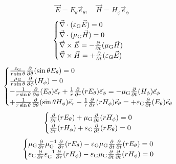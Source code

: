 \begin{equation}
    \vec{E}={E}_\theta\vec{e}_\theta,\quad\vec{H}={H}_\phi\vec{e}_\phi
\end{equation}
\begin{equation}
    \begin{cases}
        \vec{\nabla}\cdot(\varepsilon_{\text{G}}\vec{E})=0\\
        \vec{\nabla}\cdot(\mu_{\text{G}}\vec{H})=0\\
        \vec{\nabla}\times\vec{E}=-\frac{\partial}{\partial t}(\mu_{\text{G}}\vec{H})\\
        \vec{\nabla}\times\vec{H}=+\frac{\partial}{\partial t}(\varepsilon_{\text{G}}\vec{E})
    \end{cases}
\end{equation}
\begin{equation}
    \begin{cases}
        \frac{\varepsilon_{\text{G}}}{r\sin\theta}\frac{\partial}{\partial\theta}(\sin\theta E_\theta)=0\\
        \frac{\mu_{\text{G}}}{r\sin\theta}\frac{\partial}{\partial\phi}({H}_\phi)=0\\
        -\frac{1}{r\sin\theta}\frac{\partial}{\partial\phi}({E}_\theta)\vec{e}_r+\frac{1}{r}\frac{\partial}{\partial r}(r{E}_\theta)\vec{e}_\phi=-\mu_{\text{G}}\frac{\partial}{\partial t}({H}_\phi)\vec{e}_\phi\\
        +\frac{1}{r\sin\theta}\frac{\partial}{\partial\theta}(\sin\theta{H}_\phi)\vec{e}_r-\frac{1}{r}\frac{\partial}{\partial r}(r{H}_\phi)\vec{e}_\theta=+\varepsilon_{\text{G}}\frac{\partial}{\partial t}({E}_\theta)\vec{e}_\theta\\
    \end{cases}
\end{equation}
\begin{equation}
    \begin{cases}
        \frac{\partial}{\partial r}(r{E}_\theta)+\mu_{\text{G}}\frac{\partial}{\partial t}(r{H}_\phi)=0\\
        \frac{\partial}{\partial r}(r{H}_\phi)+\varepsilon_{\text{G}}\frac{\partial}{\partial t}(r{E}_\theta)=0\\
    \end{cases}
\end{equation}
\begin{equation}
    \begin{cases}
        \mu_{\text{G}}\frac{\partial}{\partial r}\mu_{\text{G}}^{-1}\frac{\partial}{\partial r}(r{E}_\theta)-\varepsilon_{\text{G}}\mu_{\text{G}}\frac{\partial}{\partial t}\frac{\partial}{\partial t}(r{E}_\theta)=0\\
        \varepsilon_{\text{G}}\frac{\partial}{\partial r}\varepsilon_{\text{G}}^{-1}\frac{\partial}{\partial r}(r{H}_\phi)-\varepsilon_{\text{G}}\mu_{\text{G}}\frac{\partial}{\partial t}\frac{\partial}{\partial t}(r{H}_\phi)=0\\
    \end{cases}
\end{equation}

